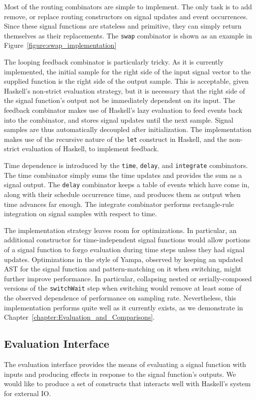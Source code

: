 Most of the routing combinators are simple to implement. The only task is to add
remove, or replace routing constructors on signal updates and event occurrences.
Since these signal functions are stateless and primitive, they can simply
return themselves as their replacements. The {\tt swap} combinator is shown as
an example in Figure~\ref{figure:swap_implementation}

The looping feedback combinator is particularly tricky. As it is currently
implemented, the initial sample for the right side of the input signal vector to
the supplied function is the right side of the output sample. This is acceptable,
given Haskell's non-strict evaluation strategy, but it is necessary that the
right side of the signal function's output not be immediately dependent on its
input. The feedback combinator makes use of Haskell's lazy evaluation to
feed events back into the combinator, and stores signal updates until the next
sample. Signal samples are thus automatically decoupled after initialization.
The implementation makes use of the recursive nature of the {\tt let} construct
in Haskell, and the non-strict evaluation of Haskell, to implement feedback.

Time dependence is introduced by the {\tt time}, {\tt delay}, and {\tt integrate}
combinators. The time combinator simply sums the time updates and provides the
sum as a signal output. The {\tt delay} combinator keeps a table of events
which have come in, along with their schedule occurrence time, and produces
them as output when time advances far enough. The integrate combinator performs
rectangle-rule integration on signal samples with respect to time.

The implementation strategy leaves room for optimizations. In particular, an
additional constructor for time-independent signal functions would allow
portions of a signal function to forgo evaluation during time steps unless they
had signal updates. Optimizations in the style of Yampa, observed by keeping
an updated AST for the signal function and pattern-matching on it when switching,
might further improve performance. In particular, collapsing nested or
serially-composed versions of the {\tt switchWait} step when switching would
remove at least some of the observed dependence of performance on sampling rate.
Nevertheless, this implementation performs quite well as it currently exists, as
we demonstrate in Chapter~\ref{chapter:Evaluation_and_Comparisons}.

\subsection{Evaluation Interface}
\label{subsection:Implementation-Evaluation_Interface}
The evaluation interface provides the means of evaluating a signal function
with inputs and producing effects in response to the signal function's outputs.
We would like to produce a set of constructs that interacts well with Haskell's
system for external IO.

